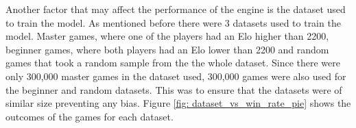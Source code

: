Another factor that may affect the performance of the engine is the dataset used to train the model. As mentioned before there were 3 datasets used to train the model. Master games, where one of the players had an Elo higher than 2200, beginner games, where both players had an Elo lower than 2200 and random games that took a random sample from the the whole dataset. Since there were only 300,000 master games in the dataset used, 300,000 games were also used for the beginner and random datasets. This was to ensure that the datasets were of similar size preventing any bias. Figure \ref{fig: dataset_vs_win_rate_pie} shows the outcomes of the games for each dataset.















